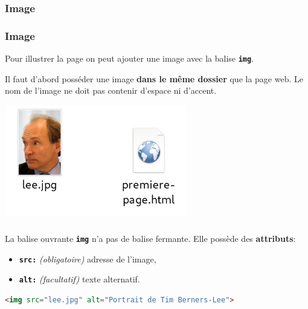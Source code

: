 \documentclass[svgnames,11pt]{beamer}
\begin{document}
\subsubsection{Image}
\begin{frame}
    \frametitle{Image}
    Pour illustrer la page on peut ajouter une image avec la balise \textbf{\texttt{img}}.

    Il faut d'abord posséder une image \textbf{dans le même dossier} que la page web. Le nom de l'image ne doit pas contenir d'espace ni d'accent.
    \begin{center}
        \centering
        \includegraphics[width=8cm]{ressources/dossier-img.png}
        \label{IMG}
    \end{center}
\end{frame}
\begin{frame}[fragile]
    \frametitle{}

    La balise ouvrante \textbf{\texttt{img}} n'a pas de balise fermante. Elle possède des \textbf{attributs}:
    \begin{itemize}
        \item \textbf{\texttt{src:}} \emph{(obligatoire)} adresse de l'image,
        \item \textbf{\texttt{alt:}} \emph{(facultatif)} texte alternatif.
    \end{itemize}
    \begin{center}
        \begin{lstlisting}[language=html , basicstyle=\ttfamily\small, xleftmargin=0.5em, xrightmargin=-1em]
<img src="lee.jpg" alt="Portrait de Tim Berners-Lee">
\end{lstlisting}
    \end{center}


\end{frame}
\end{document}
